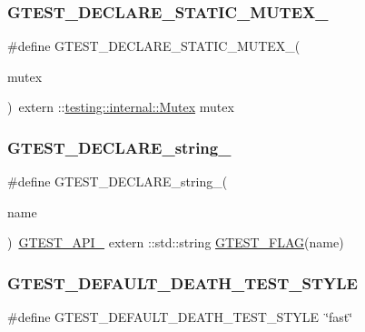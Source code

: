 \subsubsection{\texorpdfstring{GTEST\_DECLARE\_STATIC\_MUTEX\_}{GTEST\_DECLARE\_STATIC\_MUTEX\_}}
{\footnotesize\ttfamily \#define G\+T\+E\+S\+T\+\_\+\+D\+E\+C\+L\+A\+R\+E\+\_\+\+S\+T\+A\+T\+I\+C\+\_\+\+M\+U\+T\+E\+X\+\_\+(\begin{DoxyParamCaption}\item[{}]{mutex }\end{DoxyParamCaption})~extern \+::\mbox{\hyperlink{classtesting_1_1internal_1_1_mutex}{testing\+::internal\+::\+Mutex}} mutex}

\mbox{\label{googletest-master_2googletest_2include_2gtest_2internal_2gtest-port_8h_a9f74eee05f7ee5534139a622fe7da7dd}} 
\subsubsection{\texorpdfstring{GTEST\_DECLARE\_string\_}{GTEST\_DECLARE\_string\_}}
{\footnotesize\ttfamily \#define G\+T\+E\+S\+T\+\_\+\+D\+E\+C\+L\+A\+R\+E\+\_\+string\+\_\+(\begin{DoxyParamCaption}\item[{}]{name }\end{DoxyParamCaption})~\mbox{\hyperlink{_obj__test_2lib_2googletest-release-1_88_81_2googletest_2include_2gtest_2internal_2gtest-port_8h_aa73be6f0ba4a7456180a94904ce17790}{G\+T\+E\+S\+T\+\_\+\+A\+P\+I\+\_\+}} extern \+::std\+::string \mbox{\hyperlink{_obj__test_2lib_2googletest-release-1_88_81_2googletest_2include_2gtest_2internal_2gtest-port_8h_a828f4e34a1c4b510da50ec1563e3562a}{G\+T\+E\+S\+T\+\_\+\+F\+L\+AG}}(name)}

\mbox{\label{googletest-master_2googletest_2include_2gtest_2internal_2gtest-port_8h_a491d09ee62f1c9cfeafa3dbf75aaa9e2}} 
\subsubsection{\texorpdfstring{GTEST\_DEFAULT\_DEATH\_TEST\_STYLE}{GTEST\_DEFAULT\_DEATH\_TEST\_STYLE}}
{\footnotesize\ttfamily \#define G\+T\+E\+S\+T\+\_\+\+D\+E\+F\+A\+U\+L\+T\+\_\+\+D\+E\+A\+T\+H\+\_\+\+T\+E\+S\+T\+\_\+\+S\+T\+Y\+LE~\char`\"{}fast\char`\"{}}

